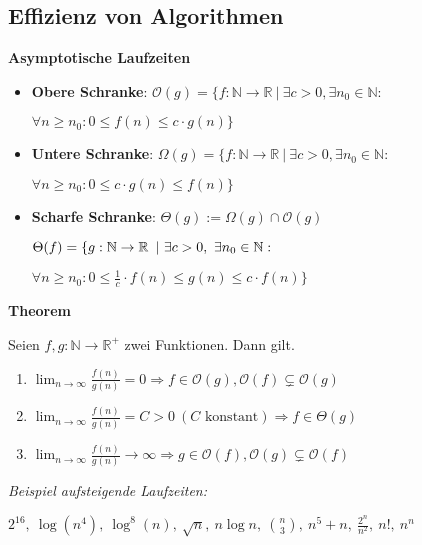 \begin{sectionbox}
\subsection{Effizienz von Algorithmen}\smallskip

\textbf{Asymptotische Laufzeiten}\par
\begin{itemize}
    \item \textbf{Obere Schranke}: $\mathcal{O}(g)=\{f:\mathbb{N} \rightarrow \mathbb{R}\ |\ \exists c>0, \exists n_{0} \in \mathbb{N}:$\par $\forall n \geq n_{0}: 0 \leq f(n) \leq c \cdot g(n)\}$
    \item \textbf{Untere Schranke}: $\Omega(g)=\{f: \mathbb{N} \rightarrow \mathbb{R}\ |\ \exists c>0, \exists n_{0} \in \mathbb{N}:$ \par $\forall n \geq n_{0}: 0 \leq c \cdot g(n) \leq f(n)\}$
    \item \textbf{Scharfe Schranke}: $\Theta(g):=\Omega(g) \cap \mathcal{O}(g)$\par
    $\Theta(f) = \{  g: \N \rightarrow \R\ |\ \exists c>0,\ \exists n_0 \in \N:$\par $\forall n \geq n_0: 0 \leq \frac1c \cdot f(n)\leq g(n) \leq c \cdot f(n)\}$
\end{itemize}\par\smallskip

\begin{greenbox}
\textbf{Theorem}\par
Seien $f, g: \mathbb{N} \rightarrow \mathbb{R}^{+}$ zwei Funktionen. Dann gilt.
\begin{enumerate}
    \item $\lim _{n \rightarrow \infty}\limits \frac{f(n)}{g(n)}=0 \Rightarrow f \in \mathcal{O}(g), \mathcal{O}(f) \subsetneq \mathcal{O}(g)$
    \item $\lim _{n \rightarrow \infty}\limits \frac{f(n)}{g(n)}=C>0\ (C \text { konstant}) \Rightarrow f \in \Theta(g)$
    \item $\lim _{n \rightarrow \infty}\limits \frac{f(n)}{g(n)} \longrightarrow \infty \Rightarrow g \in \mathcal{O}(f), \mathcal{O}(g) \subsetneq \mathcal{O}(f)$
\end{enumerate}
\end{greenbox}\smallskip
\textit{Beispiel aufsteigende Laufzeiten:}\par
$ 2^{16},\ \log(n^4),\ \log^8(n),\ \sqrt{n},\ n\log n,\ \binom{n}{3},\ n^5+n,\ \frac{2^n}{n^2},\ n!,\ n^n$\par\smallskip
\end{sectionbox}
